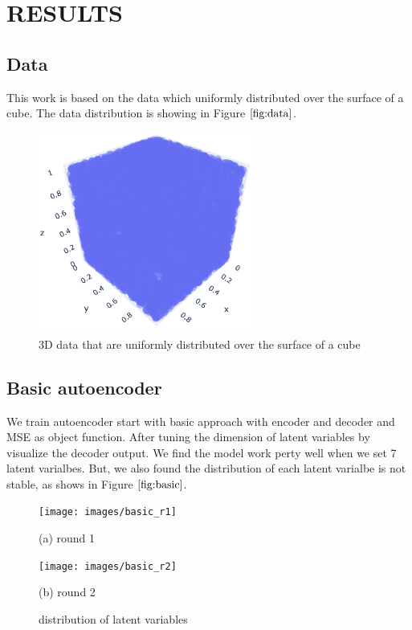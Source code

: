 \documentclass{article}
\begin{document}
\section{RESULTS}
\label{sec:results}

\subsection{Data}
\label{ssec:data}

This work is based on the data which uniformly distributed over the surface of a cube. 
The data distribution is showing in Figure $\ref{fig:data}$.

\begin{figure}[htb]
  \begin{minipage}[b]{1.0\linewidth}
    \centering
    \centerline{\includegraphics[width=7.0cm]{images/data}}
  \end{minipage}
  \caption{3D data that are uniformly distributed over the surface of a cube}
  \label{fig:data}
  \end{figure}

\subsection{Basic autoencoder}
\label{ssec:basicautoencoder}

We train autoencoder start with basic approach with encoder and decoder and MSE as object function.
After tuning the dimension of latent variables by visualize the decoder output. 
We find the model work perty well when we set 7 latent varialbes.
But, we also found the distribution of each latent varialbe is not stable, as shows in Figure $\ref{fig:basic}$.

\begin{figure}[htb]
  \begin{minipage}[b]{1.0\linewidth}
    \centering
    \centerline{\texttt{[image: images/basic\_r1]}}
    \centerline{(a) round 1}\medskip
  \end{minipage}
  \hfill
  \begin{minipage}[b]{1.0\linewidth}
    \centering
    \centerline{\texttt{[image: images/basic\_r2]}}
    \centerline{(b) round 2 }\medskip
  \end{minipage}
  \caption{distribution of latent variables}
  \label{fig:basic}
  \end{figure}
\end{document}
